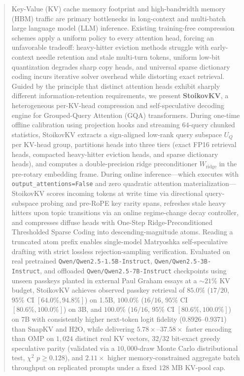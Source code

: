 \documentclass[conference]{IEEEtran}
\begin{document}
\begin{abstract}
Key-Value (KV) cache memory footprint and high-bandwidth memory (HBM) traffic are primary bottlenecks in long-context and multi-batch large language model (LLM) inference. Existing training-free compression schemes apply a uniform policy to every attention head, forcing an unfavorable tradeoff: heavy-hitter eviction methods struggle with early-context needle retention and stale multi-turn tokens, uniform low-bit quantization degrades sharp copy heads, and universal sparse dictionary coding incurs iterative solver overhead while distorting exact retrieval. Guided by the principle that distinct attention heads exhibit sharply different information-retention requirements, we present \textbf{StoikovKV}, a heterogeneous per-KV-head compression and self-speculative decoding engine for Grouped-Query Attention (GQA) transformers. During one-time offline calibration using projection hooks and streaming $64$-query chunked statistics, StoikovKV extracts a sign-aligned low-rank query subspace $U_Q$ per KV-head group, partitions heads into three tiers (exact FP16 retrieval heads, compacted heavy-hitter eviction heads, and sparse dictionary heads), and computes a double-precision ridge preconditioner $W_{\text{ridge}}$ in the pre-rotary embedding frame. During online inference---which executes with \texttt{output\_attentions=False} and zero quadratic attention materialization---StoikovKV scores incoming tokens at write time via directional query-subspace probing and pre-RoPE key rarity spans, refreshes stale heavy hitters upon topic transitions via an online regime-change decay controller, and compresses diffuse heads with One-Step Ridge-Preconditioned Thresholded Sparse Coding into descending-magnitude atoms. Reading a truncated atom prefix enables single-model Matryoshka self-speculative drafting with strict lossless rejection-sampling verification. Evaluated on real pretrained \texttt{Qwen/Qwen2.5-1.5B-Instruct}, \texttt{Qwen/Qwen2.5-3B-Instruct}, and offloaded \texttt{Qwen/Qwen2.5-7B-Instruct} checkpoints using unseen passkeys planted in external Paul Graham essays at a $\sim 21\%$ KV budget, StoikovKV achieves observed passkey retrieval of $85.0\%$ ($17/20$, $95\%$ CI $[64.0\%, 94.8\%]$) on 1.5B, $100.0\%$ ($16/16$, $95\%$ CI $[80.6\%, 100.0\%]$) on 3B, and $100.0\%$ ($16/16$, $95\%$ CI $[80.6\%, 100.0\%]$) on 7B with consistently higher next-token logit fidelity ($0.8926$--$0.9371$) than SnapKV and H2O, while delivering $5.78\times$--$37.58\times$ faster encoding than OMP on $1{,}024$ distinct real KV vectors, $32/32$ bit-exact greedy speculative parity (validated via a $10{,}000$-draw Monte Carlo distributional test, $\chi^2$ $p \ge 0.128$), and $2.11\times$ higher memory-constrained aggregate batch throughput on replicated prompts under a fixed $128\text{ MB}$ KV-pool cap.
\end{abstract}
\end{document}
